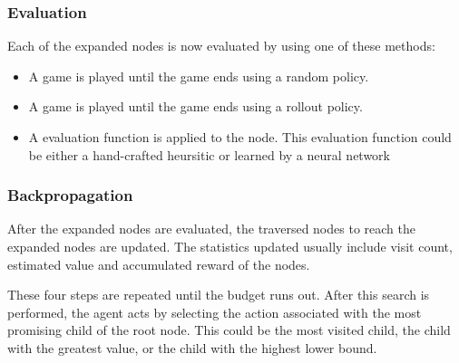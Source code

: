 \documentclass[12pt]{article}
\begin{document}
\subsubsection{Evaluation}
Each of the expanded nodes is now evaluated by using one of these methods:
\begin{itemize}
    \item A game is played until the game ends using a random policy.
    \item A game is played until the game ends using a rollout policy.
    \item A evaluation function is applied to the node.
          This evaluation function could be either a hand-crafted heursitic
          or learned by a neural network
\end{itemize}

\subsubsection{Backpropagation}
After the expanded nodes are evaluated, the traversed nodes to reach the expanded nodes are updated.
The statistics updated usually include visit count, estimated value and accumulated reward of the nodes.

These four steps are repeated until the budget runs out.
After this search is performed, the agent acts by selecting the action associated with the most promising child of the root node.
This could be the most visited child, the child with the greatest value, or the child with the highest lower bound.
\end{document}
